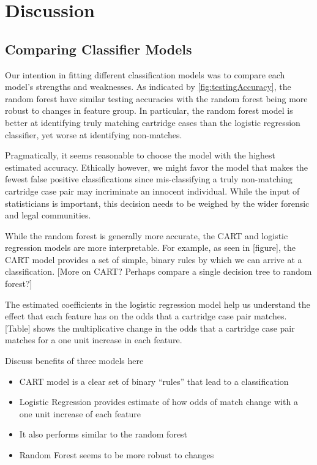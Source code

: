\documentclass[
]{jdssv}
\begin{document}
\hypertarget{discussion}{%
\section{Discussion}\label{discussion}}

\hypertarget{comparing-classifier-models}{%
\subsection{Comparing Classifier
Models}\label{comparing-classifier-models}}

Our intention in fitting different classification models was to compare
each model's strengths and weaknesses. As indicated by
\autoref{fig:testingAccuracy}, the random forest have similar testing
accuracies with the random forest being more robust to changes in
feature group. In particular, the random forest model is better at
identifying truly matching cartridge cases than the logistic regression
classifier, yet worse at identifying non-matches.

Pragmatically, it seems reasonable to choose the model with the highest
estimated accuracy. Ethically however, we might favor the model that
makes the fewest false positive classifications since mis-classifying a
truly non-matching cartridge case pair may incriminate an innocent
individual. While the input of statisticians is important, this decision
needs to be weighed by the wider forensic and legal communities.

While the random forest is generally more accurate, the CART and
logistic regression models are more interpretable. For example, as seen
in {[}figure{]}, the CART model provides a set of simple, binary rules
by which we can arrive at a classification. {[}More on CART? Perhaps
compare a single decision tree to random forest?{]}

The estimated coefficients in the logistic regression model help us
understand the effect that each feature has on the odds that a cartridge
case pair matches. {[}Table{]} shows the multiplicative change in the
odds that a cartridge case pair matches for a one unit increase in each
feature.

Discuss benefits of three models here

\begin{itemize}
\item
  CART model is a clear set of binary ``rules'' that lead to a
  classification
\item
  Logistic Regression provides estimate of how odds of match change with
  a one unit increase of each feature
\item
  It also performs similar to the random forest
\item
  Random Forest seems to be more robust to changes
\end{itemize}
\end{document}
